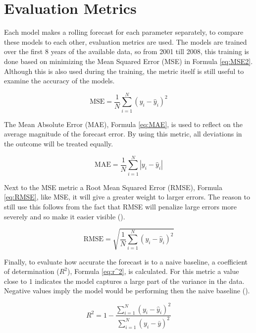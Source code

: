 \section{Evaluation Metrics}
\label{evaluation metrics method}
Each model makes a rolling forecast for each parameter separately, to compare these models to each other, evaluation metrics are used. The models are trained over the first 8 years of the available data, so from 2001 till 2008, this training is done based on minimizing the Mean Squared Error (MSE) in Formula \ref{eq:MSE2}. Although this is also used during the training, the metric itself is still useful to examine the accuracy of the models.

\begin{equation}
\label{eq:MSE2}
\text{MSE} = \frac{1}{N} \sum_{i=1}^{N} \left(y_i - \hat{y}_i\right)^2
\end{equation}

\noindent The Mean Absolute Error (MAE), Formula \ref{eq:MAE}, is used to reflect on the average magnitude of the forecast error. By using this metric, all deviations in the outcome will be treated equally. 

\begin{equation}
\label{eq:MAE}
\text{MAE} = \frac{1}{N} \sum_{i=1}^{N} \left|y_i - \hat{y}_i\right|
\end{equation}

\noindent Next to the MSE metric a Root Mean Squared Error (RMSE), Formula \ref{eq:RMSE}, like MSE, it will give a greater weight to larger errors. The reason to still use this follows from the fact that RMSE will penalize large errors more severely and so make it easier visible (\cite{hyndman2018forecasting}). 

\begin{equation}
\label{eq:RMSE}
\text{RMSE} = \sqrt{\frac{1}{N} \sum_{i=1}^{N} \left(y_i - \hat{y}_i\right)^2}
\end{equation}

\noindent Finally, to evaluate how accurate the forecast is to a naive baseline, a coefficient of determination ($R^2$), Formula \ref{eq:r^2}, is calculated. For this metric a value close to $1$ indicates the model captures a large part of the variance in the data. Negative values imply the model would be performing then the naive baseline (\cite{montgomery2012introduction}).

\begin{equation}
\label{eq:r^2}
R^2 = 1 - \frac{\sum_{i=1}^{N} \left(y_i - \hat{y}_i\right)^2}{\sum_{i=1}^{N} \left(y_i - \bar{y}\right)^2}
\end{equation}


